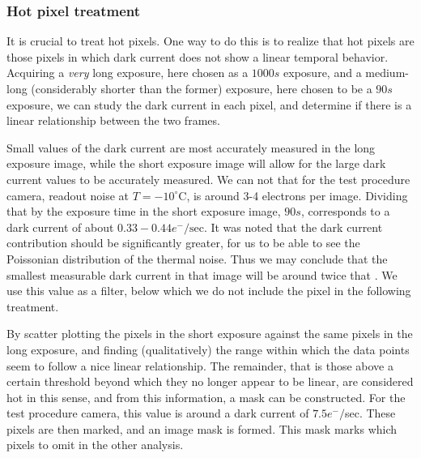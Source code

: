 \documentclass[../main.tex]{subfiles}
\begin{document}
		\subsubsection{Hot pixel treatment}
		It is crucial to treat hot pixels. One way to do this is to realize that hot pixels are those pixels in which dark current does not show a linear temporal behavior. Acquiring a \textit{very} long exposure, here chosen as a $1000s$ exposure, and a medium-long (considerably shorter than the former) exposure, here chosen to be a $90s$ exposure, we can study the dark current in each pixel, and determine if there is a linear relationship between the two frames. 
		
		Small values of the dark current are most accurately measured in the long exposure image, while the short exposure image will allow for the large dark current values to be accurately measured. We can not that for the test procedure camera, readout noise at $T = -10^\circ$C, is around 3-4 electrons per image. Dividing that by the exposure time in the short exposure image, $90s$, corresponds to a dark current of about $0.33-0.44 e^-/\text{sec}$. It was noted that the dark current contribution should be significantly greater, for us to be able to see the Poissonian distribution of the thermal noise. Thus we may conclude that the smallest measurable dark current in that image will be around twice that \cite{bibid}. We use this value as a filter, below which we do not include the pixel in the following treatment. 
		
		By scatter plotting the pixels in the short exposure against the same pixels in the long exposure, and finding (qualitatively) the range within which the data points seem to follow a nice linear relationship. The remainder, that is those above a certain threshold beyond which they no longer appear to be linear, are considered hot in this sense, and from this information, a mask can be constructed. For the test procedure camera, this value is around a dark current of $7.5 e^-/$sec. These pixels are then marked, and an image mask is formed. This mask marks which pixels to omit in the other analysis.
		
\end{document}
